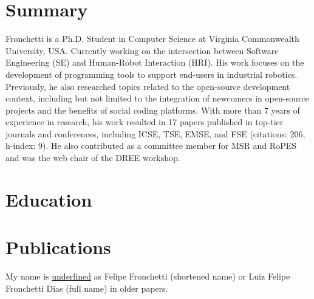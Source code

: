 \documentclass[10pt]{extarticle}
\begin{document}
\createHeader

\section{Summary}
\small Fronchetti is a Ph.D. Student in Computer Science at Virginia Commonwealth University, USA. Currently working on the intersection between Software Engineering (SE) and Human-Robot Interaction (HRI). His work focuses on the development of programming tools to support end-users in industrial robotics. Previously, he also researched topics related to the open-source development context, including but not limited to the integration of newcomers in open-source projects and the benefits of social coding platforms. With more than 7 years of experience in research, his work resulted in 17 papers published in top-tier journals and conferences, including ICSE, TSE, EMSE, and FSE (citations: 206, h-index: 9). He also contributed as a committee member for MSR and RoPES and was the web chair of the DREE workshop.

\section{Education}
%
%
%

\section{Publications}
\footnotesize My name is \underline{underlined} as Felipe Fronchetti (shortened name) or Luiz Felipe Fronchetti Dias (full name) in older papers.
\end{document}

